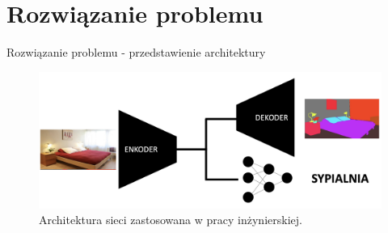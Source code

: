 \documentclass[10pt]{beamer}
\begin{document}
\section*{Rozwiązanie problemu}
\begin{frame}{Rozwiązanie problemu - przedstawienie architektury}
    \begin{figure}
        \includegraphics[width=\textwidth]{images/cep_arch.png}
        \caption{Architektura sieci zastosowana w pracy inżynierskiej.}
    \end{figure}
\end{frame}
\end{document}
